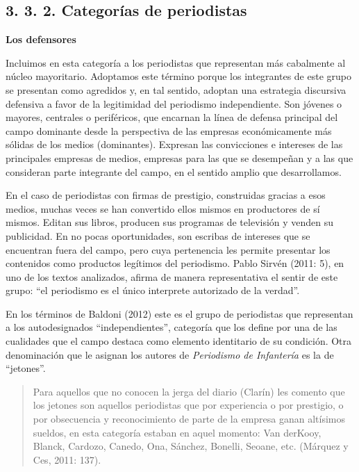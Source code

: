 \subsection{3. 3. 2. Categorías de periodistas}

\textbf{Los defensores}

Incluimos en esta categoría a los periodistas que representan más cabalmente al núcleo mayoritario. Adoptamos este término porque los integrantes de este grupo se presentan como agredidos y, en tal sentido, adoptan una estrategia discursiva defensiva a favor de la legitimidad del periodismo independiente. Son jóvenes o mayores, centrales o periféricos, que encarnan la línea de defensa principal del campo dominante desde la perspectiva de las empresas económicamente más sólidas de los medios (dominantes). Expresan las convicciones e intereses de las principales empresas de medios, empresas para las que se desempeñan y a las que consideran parte integrante del campo, en el sentido amplio que desarrollamos.

En el caso de periodistas con firmas de prestigio, construidas gracias a esos medios, muchas veces se han convertido ellos mismos en productores de sí mismos. Editan sus libros, producen sus programas de televisión y venden su publicidad. En no pocas oportunidades, son escribas de intereses que se encuentran fuera del campo, pero cuya pertenencia les permite presentar los contenidos como productos legítimos del periodismo. Pablo Sirvén (2011: 5), en uno de los textos analizados, afirma de manera representativa el sentir de este grupo: ``el periodismo es el único interprete autorizado de la verdad''.

En los términos de Baldoni (2012) este es el grupo de periodistas que representan a los autodesignados ``independientes'', categoría que los define por una de las cualidades que el campo destaca como elemento identitario de su condición. Otra denominación que le asignan los autores de \emph{Periodismo de Infantería} es la de ``jetones''.

\begin{quote}
Para aquellos que no conocen la jerga del diario (Clarín) les comento que los jetones son aquellos periodistas que por experiencia o por prestigio, o por obsecuencia y reconocimiento de parte de la empresa ganan altísimos sueldos, en esta categoría estaban en aquel momento: Van derKooy, Blanck, Cardozo, Canedo, Ona, Sánchez, Bonelli, Seoane, etc. (Márquez y Ces, 2011: 137).
\end{quote}

